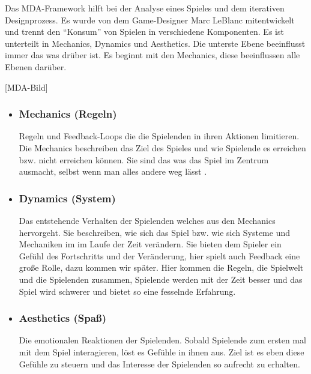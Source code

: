 Das MDA-Framework hilft bei der Analyse eines Spieles und dem iterativen Designprozess. Es wurde von dem Game-Designer Marc LeBlanc mitentwickelt und trennt den "`Konsum"' von Spielen in verschiedene Komponenten\cite{_mda}. Es ist unterteilt in Mechanics, Dynamics und Aesthetics. Die unterste Ebene beeinflusst immer das was drüber ist. Es beginnt mit den Mechanics, diese beeinflussen alle Ebenen darüber.

[MDA-Bild]


\begin{itemize}
\item\subsubsection{Mechanics (Regeln)}

Regeln und Feedback-Loops die die Spielenden in ihren Aktionen limitieren. Die Mechanics beschreiben das Ziel des Spieles und wie Spielende es erreichen bzw. nicht erreichen können\cite[S.96]{_art_of_gamedesign}. Sie sind das was das Spiel im Zentrum ausmacht, selbst wenn man alles andere weg lässt \cite[S.231]{_art_of_gamedesign}.
 
\item\subsubsection{Dynamics (System)}

Das entstehende Verhalten der Spielenden welches aus den Mechanics hervorgeht\cite{_mda}. Sie beschreiben, wie sich das Spiel bzw. wie sich Systeme und Mechaniken im  im Laufe der Zeit verändern. Sie bieten dem Spieler ein Gefühl des Fortschritts und der Veränderung, hier spielt auch Feedback eine große Rolle, dazu kommen wir später. Hier kommen die Regeln, die Spielwelt und die Spielenden zusammen, Spielende werden mit der Zeit besser und das Spiel wird schwerer und bietet so eine fesselnde Erfahrung.

\item\subsubsection{Aesthetics (Spaß)}

Die emotionalen Reaktionen der Spielenden. Sobald Spielende zum ersten mal mit dem Spiel interagieren, löst es Gefühle in ihnen aus. Ziel ist es eben diese Gefühle zu steuern und das Interesse der Spielenden so aufrecht zu erhalten.\newline

\end{itemize}

